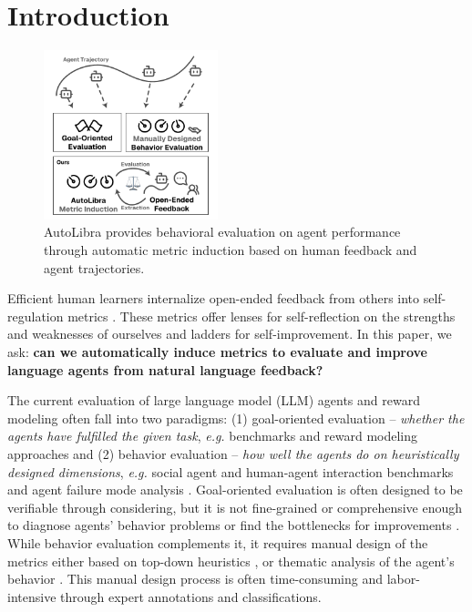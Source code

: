 \section{Introduction}

\begin{figure}
   \vspace{-40pt}
   \centering
   \includegraphics[width=0.45\textwidth]{figs/autolibra.pdf}
   \caption{AutoLibra provides behavioral evaluation on agent performance
    through automatic metric induction based on human feedback and agent trajectories.}
\end{figure}


Efficient human learners internalize open-ended feedback from others into self-regulation metrics
\citep{pintrich2002development,nicol2006formative}.
These metrics offer lenses for self-reflection on the
strengths and weaknesses of ourselves and ladders for self-improvement.
In this paper, we ask:
\textbf{can we automatically induce metrics to evaluate and improve language agents from natural language feedback?} 

   
The current evaluation of large language model (LLM) agents and reward modeling often fall
into two paradigms: (1) goal-oriented evaluation --
\emph{whether the agents have fulfilled the given task},
\emph{e.g.} benchmarks \citep{zhouwebarena,jimenezswe,chan2024mle,paglieri2024balrog} and reward
modeling approaches \citep{pan2024autonomous,chen2025scaling,choudhury2025process}
and (2) behavior evaluation -- \emph{how well the agents do on heuristically designed dimensions},
\emph{e.g.} social agent and human-agent interaction benchmarks \citep{zhousotopia,shao2024collaborative}
and agent failure mode analysis \citep{pan2025why,zhang2023effects,yang2023behavioral}. 
Goal-oriented evaluation is often designed to be verifiable through considering, but it is not fine-grained
or comprehensive enough to diagnose agents' behavior problems or find the bottlenecks for improvements \citep{yehudai2025survey}.  
While behavior evaluation complements it, it requires manual design of the metrics either based on top-down heuristics
\citep{zhousotopia}, or thematic analysis of the agent's behavior \citep{shao2024collaborative,pan2025why}.
This manual design process is often time-consuming and labor-intensive through expert annotations and classifications. 

